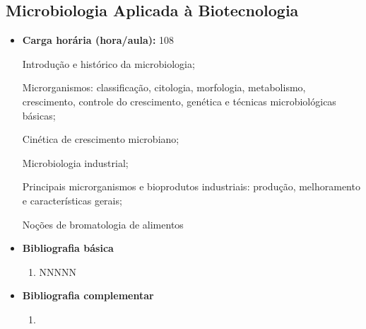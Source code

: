 \documentclass[11pt,fleqn]{book} %
\newcommand{\VER}[1]{\begingroup\color{red}#1\endgroup}
\begin{document}
\subsection{Microbiologia Aplicada à Biotecnologia}\label{disc:microbiologia}
\begin{itemize}
	\item \textbf{Carga horária (hora/aula):} 108
	
	Introdução e histórico da microbiologia; 
	
	Microrganismos: classificação, citologia, morfologia, metabolismo, crescimento, controle do crescimento, genética e técnicas microbiológicas básicas;
	
	Cinética de crescimento microbiano;
	
	Microbiologia industrial; 
	
	Principais microrganismos e bioprodutos industriais: produção, melhoramento e características gerais;
	
	\VER{Noções de bromatologia de alimentos}	
	
	\item \textbf{Bibliografia básica}
	\begin{enumerate}
		\item NNNNN
	\end{enumerate}
	\item \textbf{Bibliografia complementar}
	\begin{enumerate}
		\item 
	\end{enumerate}	
\end{itemize}


\newpage
\end{document}

